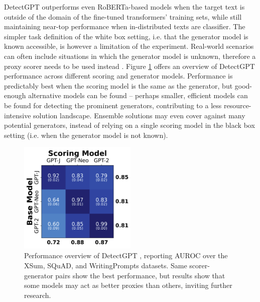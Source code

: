 DetectGPT outperforms even RoBERTa-based models when the target text is outside of the domain of the fine-tuned transformers' training sets, while still maintaining near-top performance when in-distributed texts are classifier.
The simpler task definition of the white box setting, i.e. that the generator model is known accessible, is however a limitation of the experiment.
Real-world scenarios can often include situations in which the generator model is unknown, therefore a proxy scorer needs to be used instead \citep{mireshghallah2023smaller}.
Figure \ref{fig:detectgpt} offers an overview of DetectGPT performance across different scoring and generator models.
Performance is predictably best when the scoring model is the same as the generator, but good-enough alternative models can be found -- perhaps smaller, efficient models can be found for detecting the prominent generators, contributing to a less resource-intensive solution landscape.
Ensemble solutions may even cover against many potential generators, instead of relying on a single scoring model in the black box setting (i.e. when the generator model is not known).

\begin{figure}[h]
    \centering
    \includegraphics[width=0.5\textwidth]{assets/detectgpt_modelcomp.png}
    \caption{
        Performance overview of DetectGPT \citep{mitchell2023detectgptzeroshotmachinegeneratedtext}, reporting AUROC \citep{bradley1997use} over the XSum, SQuAD, and WritingPrompts datasets.
        Same scorer-generator pairs show the best performance, but results show that some models may act as better proxies than others, inviting further research.
    }
    \label{fig:detectgpt}
\end{figure}

